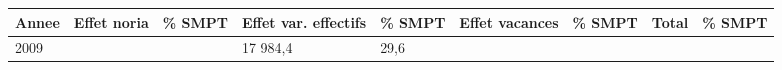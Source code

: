 \begin{longtable}[]{@{}lllllllll@{}}
\toprule
\begin{minipage}[b]{0.05\columnwidth}\raggedright
Annee\strut
\end{minipage} & \begin{minipage}[b]{0.10\columnwidth}\raggedright
Effet noria\strut
\end{minipage} & \begin{minipage}[b]{0.06\columnwidth}\raggedright
\% SMPT\strut
\end{minipage} & \begin{minipage}[b]{0.17\columnwidth}\raggedright
Effet var. effectifs\strut
\end{minipage} & \begin{minipage}[b]{0.06\columnwidth}\raggedright
\% SMPT\strut
\end{minipage} & \begin{minipage}[b]{0.13\columnwidth}\raggedright
Effet vacances\strut
\end{minipage} & \begin{minipage}[b]{0.06\columnwidth}\raggedright
\% SMPT\strut
\end{minipage} & \begin{minipage}[b]{0.05\columnwidth}\raggedright
Total\strut
\end{minipage} & \begin{minipage}[b]{0.06\columnwidth}\raggedright
\% SMPT\strut
\end{minipage}\tabularnewline
\midrule
\endhead
\begin{minipage}[t]{0.05\columnwidth}\raggedright
2009\strut
\end{minipage} & \begin{minipage}[t]{0.10\columnwidth}\raggedright
\strut
\end{minipage} & \begin{minipage}[t]{0.06\columnwidth}\raggedright
\strut
\end{minipage} & \begin{minipage}[t]{0.17\columnwidth}\raggedright
17 984,4\strut
\end{minipage} & \begin{minipage}[t]{0.06\columnwidth}\raggedright
29,6\strut
\end{minipage} & \begin{minipage}[t]{0.13\columnwidth}\raggedright
\strut
\end{minipage} & \begin{minipage}[t]{0.06\columnwidth}\raggedright

\end{minipage}
\end{longtable}
